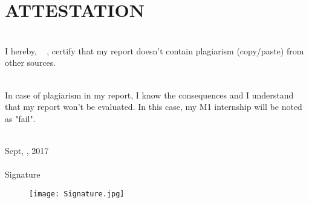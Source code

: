 \chapter*{ATTESTATION}



\vfill


\noindent\hrulefill

~\\


I hereby,  \FirstName~  \LastName, certify that my report doesn't contain plagiarism (copy/paste) from other sources.

~\\

In case of plagiarism in my report, I know the consequences and I understand that my report won't be evaluated. In this case, my M1 internship will be noted as "fail".


~\\

 Sept, , 2017 \\
 ~\\
 
 Signature 
\begin{figure}[H]
\texttt{[image: Signature.jpg]}
\end{figure}
~\\

 \FirstName~  \LastName
 

~\\
~\\
~\\
~\\
~\\

\noindent\hrulefill


\vfill


\vfill



%
%
%
%
%
%
%
%
%
% 
% 
%
% 
%
%
%
%
%
